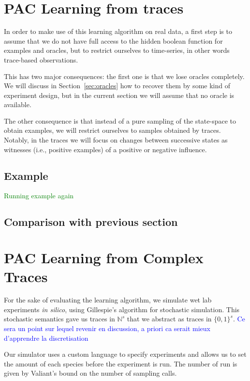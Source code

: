 \documentclass{llncs}
\newcommand{\francois}[1]{\textcolor{blue}{#1}}
\newcommand{\sylvain}[1]{\textcolor{green}{#1}}
\begin{document}
\section{PAC Learning from traces}

In order to make use of this learning algorithm on real data, a first step is
to assume that we do not have full access to the hidden boolean function for
examples and oracles, but to restrict ourselves to time-series, in other words
trace-based observations.

This has two major consequences: the first one is that we lose oracles
completely. We will discuss in Section~\ref{sec:oracles} how to recover them
by some kind of experiment design, but in the current section we will assume
that no oracle is available.

The other consequence is that instead of a pure sampling of the state-space to
obtain examples, we will restrict ourselves to samples obtained by traces.
Notably, in the traces we will focus on changes between successive states as
witnesses (i.e., positive examples) of a positive or negative influence.

\subsection{Example}

\sylvain{Running example again}

\subsection{Comparison with previous section}

\section{PAC Learning from Complex Traces}

For the sake of evaluating the learning algorithm,
we simulate wet lab experiments \emph{in silico}, using Gillespie's algorithm for stochastic simulation.
This stochastic semantics gave us traces in $\mathbb{N}^s$ that we abstract as traces in $\{0,1\}^s$.
\francois{Ce sera un point sur lequel revenir en discussion, a priori ca serait mieux d'apprendre la discretisation}

Our simulator uses a custom language to specify experiments and allows us to set the amount of each species before the experiment is run. The number of run is given by Valiant's bound on the number of sampling calls.
\end{document}
